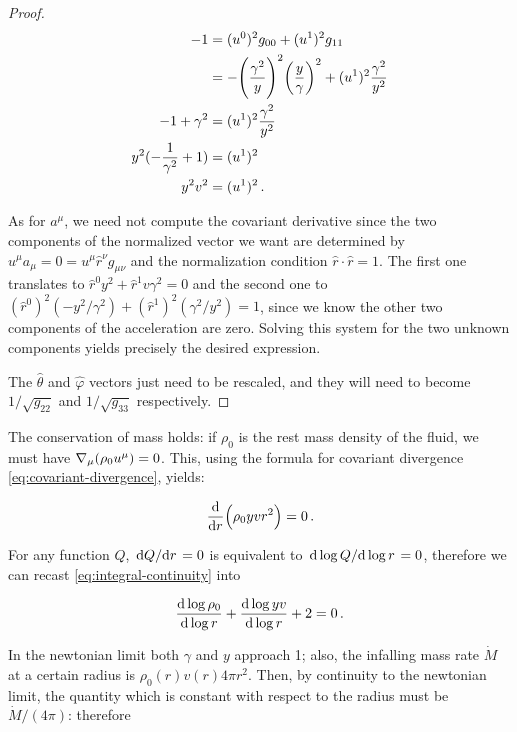 \documentclass[main.tex]{subfiles}
\begin{document}
\begin{proof}
    \begin{subequations}
    \begin{align}
      -1 &= (u^0)^2 g_{00} + (u^1)^2 g_{11} \\
      &= -\qty(\frac{\gamma^2}{y})^2 \qty(\frac{y}{\gamma} )^2 + (u^1)^2 \frac{\gamma^2}{y^2} \\
      -1 + \gamma^2 &= (u^1)^2 \frac{\gamma^2}{y^2} \\
      y^2 (-\frac{1}{\gamma^2}  + 1) &= (u^1)^2 \\
      y^2 v^2 &= (u^1)^2 \,.
    \end{align}
    \end{subequations}

    As for \(a^\mu\), we need not compute the covariant derivative since the two components of the normalized vector we want are determined by \(u^\mu a_\mu = 0= u^\mu \hat{r}^\nu g_{\mu\nu}\) and the normalization condition \(\hat{r} \cdot \hat{r} = 1\). The first one translates to \(\hat{r}^0 y^2 + \hat{r} ^1 v \gamma^2 = 0\) and the second one to \((\hat{r}^0)^2 (- y^2 / \gamma^2) + (\hat{r}^1)^2 (\gamma^2 / y^2) = 1\), since we know the other two components of the acceleration are zero.
    Solving this system for the two unknown components yields precisely the desired expression.

    The \(\hat{\theta}\) and \(\hat{\varphi}\) vectors just need to be rescaled, and they will need to become \(1 / \sqrt{g_{22}}\) and \(1/\sqrt{g_{33}}\) respectively.
\end{proof}

The conservation of mass holds: if $\rho_0$ is the rest mass density of the fluid, we must have $\nabla_\mu \qty(\rho_0 u^\mu) =0$. This, using the formula for covariant divergence \eqref{eq:covariant-divergence}, yields:

\begin{equation} \label{eq:integral-continuity}
    \dv{}{r} \qty(\rho_0 yvr^2) = 0 \,.
\end{equation}

For any function \(Q\),  \(\dv*{Q}{r} = 0\) is equivalent to \(\dv*{\log Q }{\log r} = 0 \), therefore we can recast \eqref{eq:integral-continuity} into

\begin{equation} \label{eq:differential-continuity}
  \dv{\log \rho_0}{\log r} +
  \dv{\log yv}{\log r} + 2 = 0 \,.
\end{equation}

In the newtonian limit both $\gamma$ and $y$ approach 1; also, the infalling mass rate $\Dot{M}$ at a certain radius is $\rho_0 (r) v(r) 4\pi r^2$. Then, by continuity to the newtonian limit, the quantity which is constant with respect to the radius must be $\Dot{M} / (4\pi)$: therefore
\end{document}
